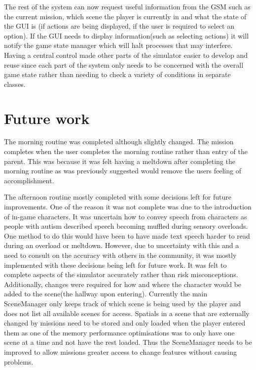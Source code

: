 \documentclass[11pt]{report}
\begin{document}
The rest of the system can now request useful information from the GSM such as the current mission, which scene the player is currently in and what the state of the GUI is (if actions are being displayed, if the user is required to select an option). If the GUI needs to display information(such as selecting actions) it will notify the game state manager which will halt processes that may interfere. Having a central control made other parts of the simulator easier to develop and reuse since each part of the system only needs to be concerned with the overall game state rather than needing to check a variety of conditions in separate classes.

\section{Future work}
\label{sec:firstver_futurework}
The morning routine was completed although slightly changed. The mission completes when the user completes the morning routine rather than entry of the parent. This was because it was felt having a meltdown after completing the morning routine as was previously suggested would remove the users feeling of accomplishment. 

The afternoon routine mostly completed with some decisions left for future improvements. One of the reason it was not complete was due to the introduction of in-game characters. It was uncertain how to convey speech from characters as people with autism described speech becoming muffled during sensory overloads. One method to do this would have been to have made text speech harder to read during an overload or meltdown. However, due to uncertainty with this and a need to consult on the accuracy with others in the community, it was mostly implemented with these decisions being left for future work. It was felt to complete aspects of the simulator accurately rather than risk misconceptions. Additionally, changes were required for how and where the character would be added to the scene(the hallway upon entering). Currently the main SceneManager only keeps track of which scene is being used by the player and does not list all available scenes for access. Spatials in a scene that are externally changed by missions need to be stored and only loaded when the player entered them as one of the memory performance optimisations was to only have one scene at a time and not have the rest loaded. Thus the SceneManager needs to be improved to allow missions greater access to change features without causing problems.
\end{document}
